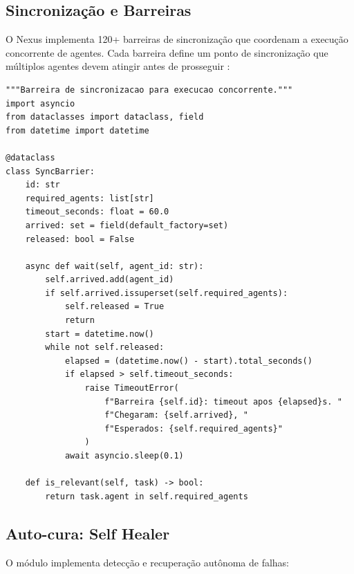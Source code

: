 \subsection{Sincronização e Barreiras}
\label{subsec:sync-barriers}

O Nexus implementa 120+ barreiras de sincronização que coordenam a
execução concorrente de agentes. Cada barreira define um ponto de
sincronização que múltiplos agentes devem atingir antes de prosseguir
\cite{weiss2013multiagent}:

\begin{lstlisting}[style=pythonstyle, caption={Barreira de sincronizacao},
                   label={lst:sync-barrier}]
"""Barreira de sincronizacao para execucao concorrente."""
import asyncio
from dataclasses import dataclass, field
from datetime import datetime

@dataclass
class SyncBarrier:
    id: str
    required_agents: list[str]
    timeout_seconds: float = 60.0
    arrived: set = field(default_factory=set)
    released: bool = False

    async def wait(self, agent_id: str):
        self.arrived.add(agent_id)
        if self.arrived.issuperset(self.required_agents):
            self.released = True
            return
        start = datetime.now()
        while not self.released:
            elapsed = (datetime.now() - start).total_seconds()
            if elapsed > self.timeout_seconds:
                raise TimeoutError(
                    f"Barreira {self.id}: timeout apos {elapsed}s. "
                    f"Chegaram: {self.arrived}, "
                    f"Esperados: {self.required_agents}"
                )
            await asyncio.sleep(0.1)

    def is_relevant(self, task) -> bool:
        return task.agent in self.required_agents
\end{lstlisting}

\subsection{Auto-cura: Self Healer}
\label{subsec:self-healer}

O módulo  implementa detecção e recuperação
autônoma de falhas:

